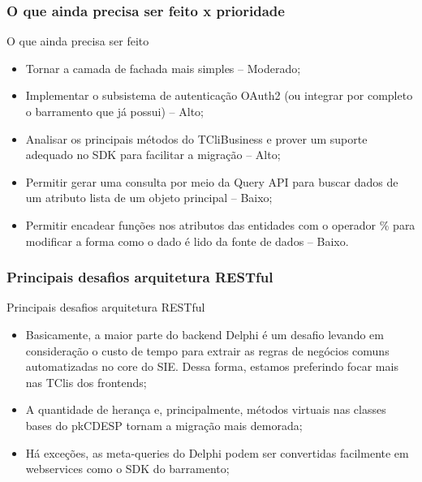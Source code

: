 \documentclass{beamer}
\begin{document}
\begin{frame}
\frametitle{O que ainda precisa ser feito x prioridade}

\begin{exampleblock}{O que ainda precisa ser feito}
	
	\begin{itemize}
		\item<1->Tornar a camada de fachada mais simples -- Moderado;
		\item<1->Implementar o subsistema de autenticação OAuth2 (ou integrar por completo o barramento que já possui) -- Alto;
		\item<1->Analisar os principais métodos do TCliBusiness e prover um suporte adequado no SDK para facilitar a migração -- Alto;
		\item<1->Permitir gerar uma consulta por meio da Query API para buscar dados de um atributo lista de um objeto principal -- Baixo;
		\item<1->Permitir encadear funções nos atributos das entidades com o operador \% para modificar a forma como o dado é lido da fonte de dados -- Baixo.
		
		
	\end{itemize}
	
\end{exampleblock}







\end{frame}


\begin{frame}
\frametitle{Principais desafios arquitetura RESTful}

\begin{exampleblock}{Principais desafios arquitetura RESTful}
	\small{
	\begin{itemize}
		\item<1->Basicamente, a maior parte do backend Delphi é um desafio levando em consideração o custo de tempo para extrair as regras de negócios comuns automatizadas no core do SIE. Dessa forma, estamos preferindo focar mais nas TClis dos frontends;
		\item<1->A quantidade de herança e, principalmente, métodos virtuais nas classes bases do pkCDESP tornam a migração mais demorada;
		\item<1->Há exceções, as meta-queries do Delphi podem ser convertidas facilmente em webservices como o SDK do barramento;
	\end{itemize}
}
\end{exampleblock}

\end{frame}
\end{document}
